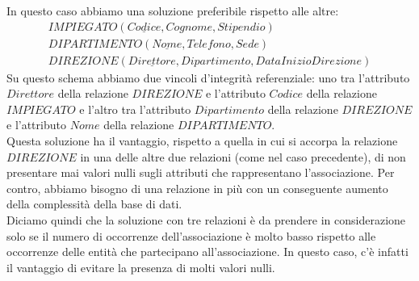 In questo caso abbiamo una soluzione preferibile rispetto alle altre:
    \begin{equation}\begin{aligned}
        IMPIEGATO(\underline{Codice}, Cognome, Stipendio)\\
        DIPARTIMENTO(\underline{Nome}, Telefono, Sede)\\
        DIREZIONE(\underline{Direttore}, Dipartimento, DataInizioDirezione)
    \end{aligned}\end{equation}
Su questo schema abbiamo due vincoli d'integrità referenziale: uno tra l'attributo $Direttore$ della relazione $DIREZIONE$ e l'attributo $Codice$ della relazione $IMPIEGATO$ e l'altro tra l'attributo $Dipartimento$ della relazione $DIREZIONE$ e l'attributo $Nome$ della relazione $DIPARTIMENTO$.\\
Questa soluzione ha il vantaggio, rispetto a quella in cui si accorpa la relazione $DIREZIONE$ in una delle altre due relazioni (come nel caso precedente), di non presentare mai valori nulli sugli attributi che rappresentano l'associazione. Per contro, abbiamo bisogno di una relazione in più con un conseguente aumento della complessità della base di dati.\\
Diciamo quindi che la soluzione con tre relazioni è da prendere in considerazione solo se il numero di occorrenze dell'associazione è molto basso rispetto alle occorrenze delle entità che partecipano all'associazione. In questo caso, c'è infatti il vantaggio di evitare la presenza di molti valori nulli.



